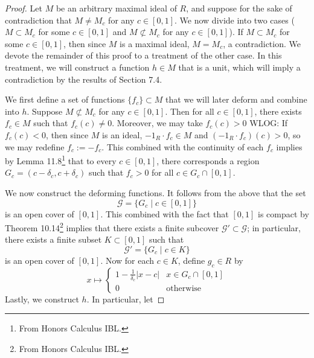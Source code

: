 \documentclass[../psets.tex]{subfiles}
\begin{document}
\begin{enumerate}
\begin{enumerate}[label={\textbf{(\alph*)}}]
\begin{proof}
            Let $M$ be an arbitrary maximal ideal of $R$, and suppose for the sake of contradiction that $M\neq M_c$ for any $c\in[0,1]$. We now divide into two cases ($M\subset M_c$ for some $c\in[0,1]$ and $M\not\subset M_c$ for any $c\in[0,1]$). If $M\subset M_c$ for some $c\in[0,1]$, then since $M$ is a maximal ideal, $M=M_c$, a contradiction. We devote the remainder of this proof to a treatment of the other case. In this treatment, we will construct a function $h\in M$ that is a unit, which will imply a contradiction by the results of Section 7.4.\par\smallskip
            We first define a set of functions $\{f_c\}\subset M$ that we will later deform and combine into $h$. Suppose $M\not\subset M_c$ for any $c\in[0,1]$. Then for all $c\in[0,1]$, there exists $f_c\in M$ such that $f_c(c)\neq 0$. Moreover, we may take $f_c(c)>0$ WLOG: If $f_c(c)<0$, then since $M$ is an ideal, $-1_R\cdot f_c\in M$ and $(-1_R\cdot f_c)(c)>0$, so we may redefine $f_c:=-f_c$. This combined with the continuity of each $f_c$ implies by Lemma 11.8\footnote{From Honors Calculus IBL.} that to every $c\in[0,1]$, there corresponds a region $G_c=(c-\delta_c,c+\delta_c)$ such that $f_c>0$ for all $c\in G_c\cap[0,1]$.\par
            We now construct the deforming functions. It follows from the above that the set
            \begin{equation*}
                \mathcal{G} = \{G_c\mid c\in[0,1]\}
            \end{equation*}
            is an open cover of $[0,1]$. This combined with the fact that $[0,1]$ is compact by Theorem 10.14\footnote{From Honors Calculus IBL.} implies that there exists a finite subcover $\mathcal{G}'\subset\mathcal{G}$; in particular, there exists a finite subset $K\subset[0,1]$ such that
            \begin{equation*}
                \mathcal{G}' = \{G_c\mid c\in K\}
            \end{equation*}
            is an open cover of $[0,1]$. Now for each $c\in K$, define $g_c\in R$ by
            \begin{equation*}
                x \mapsto
                \begin{cases}
                    1-\frac{1}{\delta_c}|x-c| & x\in G_c\cap[0,1]\\
                    0 & \text{otherwise}
                \end{cases}
            \end{equation*}
            Lastly, we construct $h$. In particular, let

\end{proof}
\end{enumerate}
\end{enumerate}
\end{document}
